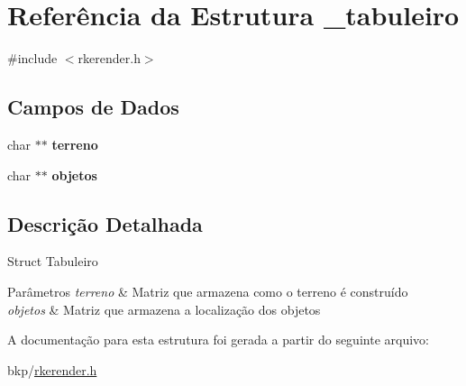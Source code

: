 \hypertarget{struct__tabuleiro}{
\section{Referência da Estrutura \_\-tabuleiro}
\label{struct__tabuleiro}
}


{\ttfamily \#include $<$rkerender.h$>$}

\subsection*{Campos de Dados}
\begin{DoxyCompactItemize}
\item 
\hypertarget{struct__tabuleiro_a769a0d58682f084ffb749f2b7ab745a4}{
char $\ast$$\ast$ {\bfseries terreno}}
\label{struct__tabuleiro_a769a0d58682f084ffb749f2b7ab745a4}

\item 
\hypertarget{struct__tabuleiro_ab72c9e88a2e860a6183e6264189de9c3}{
char $\ast$$\ast$ {\bfseries objetos}}
\label{struct__tabuleiro_ab72c9e88a2e860a6183e6264189de9c3}

\end{DoxyCompactItemize}


\subsection{Descrição Detalhada}
Struct Tabuleiro 
\begin{DoxyParams}{Parâmetros}
{\em terreno} & Matriz que armazena como o terreno é construído \\
\hline
{\em objetos} & Matriz que armazena a localização dos objetos \\
\hline
\end{DoxyParams}


A documentação para esta estrutura foi gerada a partir do seguinte arquivo:\begin{DoxyCompactItemize}
\item 
bkp/\hyperlink{rkerender_8h}{rkerender.h}\end{DoxyCompactItemize}

